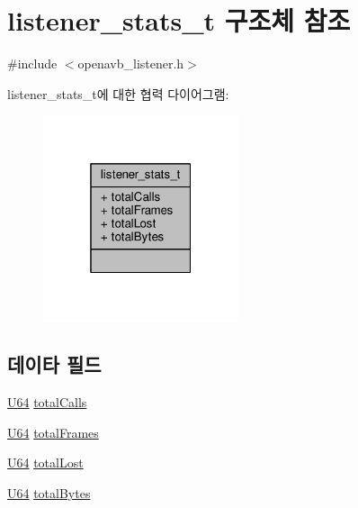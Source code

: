 \hypertarget{structlistener__stats__t}{}\section{listener\+\_\+stats\+\_\+t 구조체 참조}
\label{structlistener__stats__t}


{\ttfamily \#include $<$openavb\+\_\+listener.\+h$>$}



listener\+\_\+stats\+\_\+t에 대한 협력 다이어그램\+:
\nopagebreak
\begin{figure}[H]
\begin{center}
\leavevmode
\includegraphics[width=163pt]{structlistener__stats__t__coll__graph}
\end{center}
\end{figure}
\subsection*{데이타 필드}
\begin{DoxyCompactItemize}
\item 
\hyperlink{openavb__types__base__pub_8h_a25809e0734a149248fcf5831efa4e33d}{U64} \hyperlink{structlistener__stats__t_a9e027d04ac91998fac3dbdfe70e93c8f}{total\+Calls}
\item 
\hyperlink{openavb__types__base__pub_8h_a25809e0734a149248fcf5831efa4e33d}{U64} \hyperlink{structlistener__stats__t_a91aa71fc6996d4038afd5252772b8c16}{total\+Frames}
\item 
\hyperlink{openavb__types__base__pub_8h_a25809e0734a149248fcf5831efa4e33d}{U64} \hyperlink{structlistener__stats__t_a4e376afa9361ab883797552591108182}{total\+Lost}
\item 
\hyperlink{openavb__types__base__pub_8h_a25809e0734a149248fcf5831efa4e33d}{U64} \hyperlink{structlistener__stats__t_a0c6a9cfc47f701f45a826b03f96f8169}{total\+Bytes}
\end{DoxyCompactItemize}


